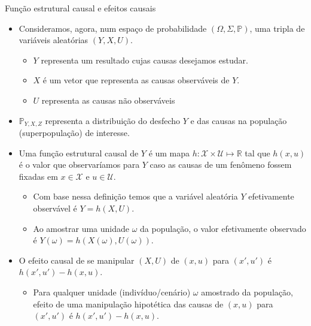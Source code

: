 \documentclass[11pt]{beamer}
\begin{document}
\begin{frame}{Função estrutural causal e efeitos causais}
	\begin{itemize}
		\item Consideramos, agora, num  espaço de probabilidade $(\Omega,\Sigma,\mathbb{P})$, uma tripla de variáveis aleatórias $(Y,X,U)$.
		\begin{itemize}
			\item $Y$ representa um resultado cujas causas desejamos estudar.
			\item $X$ é um vetor que representa as causas observáveis de $Y$.
			\item $U$ representa as causas não observáveis 
		\end{itemize}
		\item $\mathbb{P}_{Y,X,Z}$ representa a distribuição do desfecho $Y$ e das causas na população (superpopulação) de interesse.
		\item Uma {\color{blue}função estrutural causal} de $Y$ é um mapa $h: \mathcal{X}\times \mathcal{U} \mapsto \mathbb{R}$ tal que $h(x,u)$ é o valor que observaríamos para $Y$ caso as causas de um fenômeno fossem fixadas em $x \in\mathcal{X}$ e $u \in \mathcal{U}$.
		\begin{itemize}
			\item Com base nessa definição temos que a variável aleatória $Y$ efetivamente observável é $Y = h(X,U)$.
			\item Ao amostrar uma unidade $\omega$ da população, o valor efetivamente observado é $Y(\omega) =h(X(\omega), U(\omega))$.
		\end{itemize}
		\item O efeito causal de se manipular $(X,U)$ de $(x,u)$ para $(x',u')$ é $h(x',u')-h(x,u)$.
		\begin{itemize}
			\item Para qualquer unidade (indivíduo/cenário) $\omega$ amostrado da população, efeito de uma manipulação hipotética das causas de $(x,u)$ para $(x',u')$ é $h(x',u')-h(x,u)$.
		\end{itemize}
	\end{itemize}
\end{frame}
\end{document}
